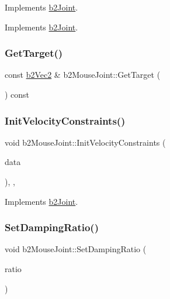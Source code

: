 Implements \mbox{\hyperlink{classb2_joint}{b2\+Joint}}. 



Implements \mbox{\hyperlink{classb2_joint_ae355e441c2aa842777dc04e24f15ced0}{b2\+Joint}}.

\mbox{\label{classb2_mouse_joint_a9904bbdf5b73f49954f37c27c983d715}} 
\subsubsection{\texorpdfstring{GetTarget()}{GetTarget()}}
{\footnotesize\ttfamily const \mbox{\hyperlink{structb2_vec2}{b2\+Vec2}} \& b2\+Mouse\+Joint\+::\+Get\+Target (\begin{DoxyParamCaption}{ }\end{DoxyParamCaption}) const}

\mbox{\label{classb2_mouse_joint_a02c342a98cfa5687de2bd3dba7c700b1}} 
\subsubsection{\texorpdfstring{InitVelocityConstraints()}{InitVelocityConstraints()}}
{\footnotesize\ttfamily void b2\+Mouse\+Joint\+::\+Init\+Velocity\+Constraints (\begin{DoxyParamCaption}\item[{const \mbox{\hyperlink{structb2_solver_data}{b2\+Solver\+Data}} \&}]{data }\end{DoxyParamCaption})\hspace{0.3cm}{\ttfamily [override]}, {\ttfamily [protected]}, {\ttfamily [virtual]}}



Implements \mbox{\hyperlink{classb2_joint_a599c013de5514e02684b958b31dd76a4}{b2\+Joint}}.

\mbox{\label{classb2_mouse_joint_a648c8f3ecb82f4887c0eefcfe48cbd37}} 
\subsubsection{\texorpdfstring{SetDampingRatio()}{SetDampingRatio()}}
{\footnotesize\ttfamily void b2\+Mouse\+Joint\+::\+Set\+Damping\+Ratio (\begin{DoxyParamCaption}\item[{\mbox{\hyperlink{b2_settings_8h_aacdc525d6f7bddb3ae95d5c311bd06a1}{float32}}}]{ratio }\end{DoxyParamCaption})}



